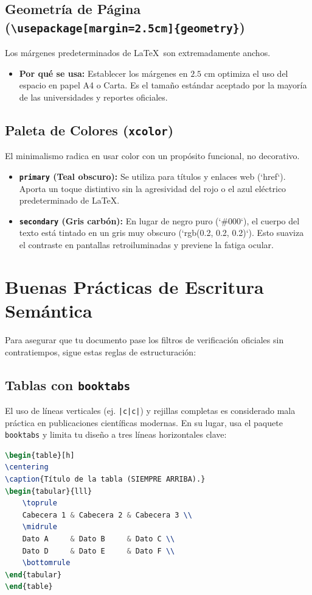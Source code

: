 \documentclass[11pt, a4paper]{article}
\begin{document}
\subsection{Geometría de Página (\texttt{\textbackslash usepackage[margin=2.5cm]\{geometry\}})}
Los márgenes predeterminados de \LaTeX\ son extremadamente anchos.
\begin{itemize}
    \item \textbf{Por qué se usa:} Establecer los márgenes en $2.5\text{ cm}$ optimiza el uso del espacio en papel A4 o Carta. Es el tamaño estándar aceptado por la mayoría de las universidades y reportes oficiales.
\end{itemize}

\subsection{Paleta de Colores (\texttt{xcolor})}
El minimalismo radica en usar color con un propósito funcional, no decorativo.
\begin{itemize}
    \item \textbf{\texttt{primary} (Teal obscuro):} Se utiliza para títulos y enlaces web (`href`). Aporta un toque distintivo sin la agresividad del rojo o el azul eléctrico predeterminado de \LaTeX.
    \item \textbf{\texttt{secondary} (Gris carbón):} En lugar de negro puro (`\#000`), el cuerpo del texto está tintado en un gris muy obscuro (`rgb(0.2, 0.2, 0.2)`). Esto suaviza el contraste en pantallas retroiluminadas y previene la fatiga ocular.
\end{itemize}

\section{Buenas Prácticas de Escritura Semántica}
Para asegurar que tu documento pase los filtros de verificación oficiales sin contratiempos, sigue estas reglas de estructuración:

\subsection{Tablas con \texttt{booktabs}}
El uso de líneas verticales (ej. \texttt{|c|c|}) y rejillas completas es considerado mala práctica en publicaciones científicas modernas. En su lugar, usa el paquete \texttt{booktabs} y limita tu diseño a tres líneas horizontales clave:
\begin{lstlisting}[language=TeX, caption={Sintaxis correcta de tablas académicas.}]
\begin{table}[h]
\centering
\caption{Título de la tabla (SIEMPRE ARRIBA).}
\begin{tabular}{lll}
    \toprule
    Cabecera 1 & Cabecera 2 & Cabecera 3 \\
    \midrule
    Dato A     & Dato B     & Dato C \\
    Dato D     & Dato E     & Dato F \\
    \bottomrule
\end{tabular}
\end{table}
\end{lstlisting}
\end{document}
